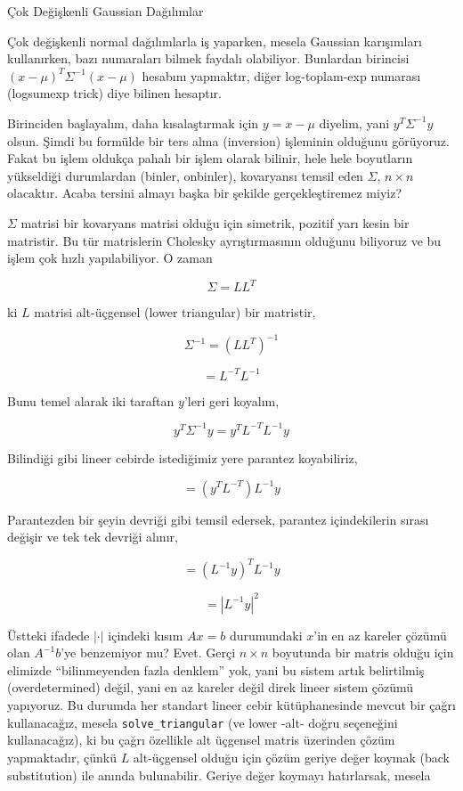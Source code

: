 \documentclass[12pt,fleqn]{article}\usepackage{../../common}
\begin{document}
Çok Değişkenli Gaussian Dağılımlar

Çok değişkenli normal dağılımlarla iş yaparken, mesela Gaussian karışımları
kullanırken, bazı numaraları bilmek faydalı olabiliyor. Bunlardan birincisi
$(x-\mu)^T\Sigma^{-1}(x-\mu)$ hesabını yapmaktır, diğer log-toplam-exp
numarası (logsumexp trick) diye bilinen hesaptır.

Birinciden başlayalım, daha kısalaştırmak için $y=x-\mu$ diyelim, yani
$y^T\Sigma^{-1}y$ olsun. Şimdi bu formülde bir ters alma (inversion)
işleminin olduğunu görüyoruz. Fakat bu işlem oldukça pahalı bir işlem
olarak bilinir, hele hele boyutların yükseldiği durumlardan (binler,
onbinler), kovaryansı temsil eden $\Sigma$, $n \times n$ olacaktır. Acaba
tersini almayı başka bir şekilde gerçekleştiremez miyiz?

$\Sigma$ matrisi bir kovaryans matrisi olduğu için simetrik, pozitif yarı
kesin bir matristir. Bu tür matrislerin Cholesky ayrıştırmasının olduğunu
biliyoruz ve bu işlem çok hızlı yapılabiliyor. O zaman 

$$ \Sigma = LL^T $$

ki $L$ matrisi alt-üçgensel (lower triangular) bir matristir,

$$ \Sigma^{-1} = (LL^T)^{-1} $$

$$ = L^{-T}L^{-1} $$

Bunu temel alarak iki taraftan $y$'leri geri koyalım,

$$ y^T\Sigma^{-1}y= y^TL^{-T}L^{-1}y $$

Bilindiği gibi lineer cebirde istediğimiz yere parantez koyabiliriz,

$$ = (y^TL^{-T})L^{-1}y $$

Parantezden bir şeyin devriği gibi temsil edersek, parantez içindekilerin
sırası değişir ve tek tek devriği alınır,

$$ = (L^{-1}y)^TL^{-1}y $$

$$  = |L^{-1}y|^2 $$

Üstteki ifadede $|\cdot|$ içindeki kısım $Ax=b$ durumundaki $x$'in en az
kareler çözümü olan $A^{-1}b$'ye benzemiyor mu? Evet. Gerçi $n \times n$
boyutunda bir matris olduğu için elimizde ``bilinmeyenden fazla denklem''
yok, yani bu sistem artık belirtilmiş (overdetermined) değil, yani en az
kareler değil direk lineer sistem çözümü yapıyoruz. Bu durumda her standart
lineer cebir kütüphanesinde mevcut bir çağrı kullanacağız, mesela
\verb!solve_triangular! (ve lower -alt- doğru seçeneğini kullanacağız), ki
bu çağrı özellikle alt üçgensel matris üzerinden çözüm yapmaktadır, çünkü
$L$ alt-üçgensel olduğu için çözüm geriye değer koymak (back substitution)
ile anında bulunabilir. Geriye değer koymayı hatırlarsak, mesela
\end{document}
